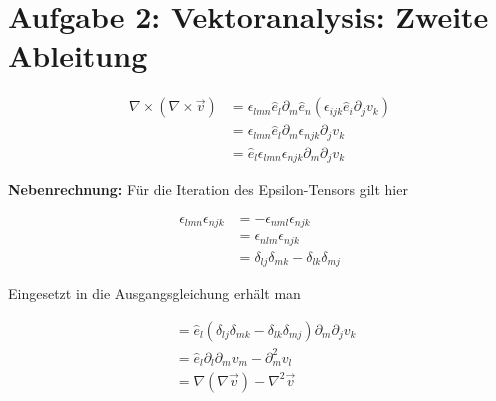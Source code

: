 \documentclass[a4paper,german,12pt,smallheadings]{scrartcl}
\begin{document}
\section*{Aufgabe 2: Vektoranalysis: Zweite Ableitung}

\begin{align*}
     \nabla \times (\nabla \times \vec{v})
     &= \epsilon_{lmn} \hat{e}_l \partial_m \hat{e}_n (\epsilon_{ijk} \hat{e}_i \partial_j v_k) \\
     &= \epsilon_{lmn} \hat{e}_l \partial_m \epsilon_{njk} \partial_j v_k \\
     &= \hat{e}_l \epsilon_{lmn} \epsilon_{njk} \partial_m \partial_j v_k
\end{align*}

\textbf{Nebenrechnung:} Für die Iteration des Epsilon-Tensors gilt hier

\begin{align*}
  \epsilon_{lmn} \epsilon_{njk} &= -\epsilon_{nml} \epsilon_{njk} \\
  &= \epsilon_{nlm} \epsilon_{njk} \\
  &= \delta_{lj}\delta_{mk} - \delta_{lk}\delta_{mj}
\end{align*}

Eingesetzt in die Ausgangsgleichung erhält man

\begin{align*}
  &= \hat{e}_l (\delta_{lj}\delta_{mk} - \delta_{lk}\delta_{mj}) \partial_m \partial_j v_k \\
  &= \hat{e}_l \partial_l \partial_m v_m - \partial_m^2 v_l \\
  &= \nabla(\nabla \vec{v}) - \nabla^2 \vec{v}
\end{align*}
\end{document}

